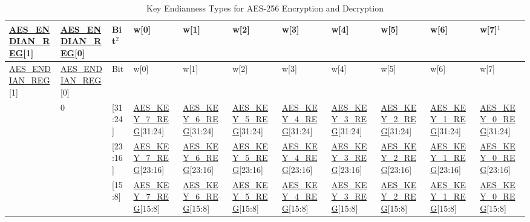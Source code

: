 \documentclass[main\_\_EN.tex]{subfiles}
\begin{document}
\begin{landscape}
\begin{tiny}
\begin{longtable}[c]
{ |p{1.5cm}|p{1.5cm}|p{0.5cm}|p{1.8cm}|p{1.8cm}|p{1.8cm}|p{1.8cm}|p{1.8cm}|p{1.8cm}|p{1.8cm}|p{1.8cm}|}
\caption{Key Endianness Types for AES-256 Encryption and Decryption}\label{table:AES256KeyEndian}\\
\hline
\rowcolor{lightgray}
\hyperref[regdesc:AESENDIANREG]{AES\_ENDIAN\_REG}[1]    &   \hyperref[regdesc:AESENDIANREG]{AES\_ENDIAN\_REG}[0]    &   Bit$^2$ &   w[0]    &   w[1]    &   w[2]    &   w[3]    &   w[4]    &   w[5]&   w[6]    &   w[7]$^1$    \\\hline
\endfirsthead
\hline
\rowcolor{lightgray}
\hyperref[regdesc:AESENDIANREG]{AES\_ENDIAN\_REG}[1]    &   \hyperref[regdesc:AESENDIANREG]{AES\_ENDIAN\_REG}[0]    &   Bit &   w[0]    &   w[1]    &   w[2]    &   w[3]    &   w[4]    &   w[5]&   w[6]    &   w[7]    \\\hline
\endhead
\endfoot
\multirow{4}{4cm}{0}    &   \multirow{4}{4cm}{0}    &   [31:24]     &   \hyperref[regdesc:AESKEYnREG]{AES\_KEY\_7\_REG}[31:24]  &   \hyperref[regdesc:AESKEYnREG]{AES\_KEY\_6\_REG}[31:24]  & \hyperref[regdesc:AESKEYnREG]{AES\_KEY\_5\_REG}[31:24]    &   \hyperref[regdesc:AESKEYnREG]{AES\_KEY\_4\_REG}[31:24]  &   \hyperref[regdesc:AESKEYnREG]{AES\_KEY\_3\_REG}[31:24]  &   \hyperref[regdesc:AESKEYnREG]{AES\_KEY\_2\_REG}[31:24]  & \hyperref[regdesc:AESKEYnREG]{AES\_KEY\_1\_REG}[31:24]    &   \hyperref[regdesc:AESKEYnREG]{AES\_KEY\_0\_REG}[31:24]\\
\cline{3-11}
&&  [23:16]     &\hyperref[regdesc:AESKEYnREG]{AES\_KEY\_7\_REG}[23:16] &   \hyperref[regdesc:AESKEYnREG]{AES\_KEY\_6\_REG}[23:16]  &   \hyperref[regdesc:AESKEYnREG]{AES\_KEY\_5\_REG}[23:16]  &   \hyperref[regdesc:AESKEYnREG]{AES\_KEY\_4\_REG}[23:16]  &   \hyperref[regdesc:AESKEYnREG]{AES\_KEY\_3\_REG}[23:16]  &   \hyperref[regdesc:AESKEYnREG]{AES\_KEY\_2\_REG}[23:16]  &   \hyperref[regdesc:AESKEYnREG]{AES\_KEY\_1\_REG}[23:16]  &   \hyperref[regdesc:AESKEYnREG]{AES\_KEY\_0\_REG}[23:16]\\
\cline{3-11}
&&  [15:8]  &   \hyperref[regdesc:AESKEYnREG]{AES\_KEY\_7\_REG}[15:8]   &   \hyperref[regdesc:AESKEYnREG]{AES\_KEY\_6\_REG}[15:8]   &\hyperref[regdesc:AESKEYnREG]{AES\_KEY\_5\_REG}[15:8]  &   \hyperref[regdesc:AESKEYnREG]{AES\_KEY\_4\_REG}[15:8]   &   \hyperref[regdesc:AESKEYnREG]{AES\_KEY\_3\_REG}[15:8]   &   \hyperref[regdesc:AESKEYnREG]{AES\_KEY\_2\_REG}[15:8]   &   \hyperref[regdesc:AESKEYnREG]{AES\_KEY\_1\_REG}[15:8]   &   \hyperref[regdesc:AESKEYnREG]{AES\_KEY\_0\_REG}[15:8]\\

\end{longtable}
\end{tiny}
\end{landscape}
\end{document}
